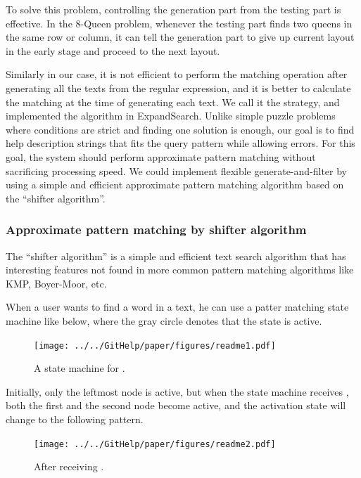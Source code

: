 \documentclass[manuscript,screen,review]{acmart}
\def\ES{\textsf{ExpandSearch}}
\begin{document}
To solve this problem,
controlling the generation part from the testing part is effective.
In the 8-Queen problem,
whenever the testing part finds two queens in the same row or column,
it can tell the generation part to
give up current layout in the early stage and proceed to the next layout.

Similarly in our case,
it is not efficient to perform the matching operation
after generating all the texts from the regular expression,
and it is better to calculate the matching
at the time of generating each text.
We call it the  strategy,
and implemented the algorithm in {\ES}.
Unlike simple puzzle problems where
conditions are strict and finding one solution is enough,
our goal is to find help description strings
that fits the query pattern while allowing errors.
For this goal,
the system should perform approximate pattern matching
without sacrificing processing speed.
%
We could implement flexible generate-and-filter by using a simple and efficient
approximate pattern matching algorithm based on the ``shifter algorithm''.

\subsubsection{Approximate pattern matching by shifter algorithm}

The ``shifter algorithm''\cite{Wu:1992:FTS:135239.135244}
is a simple and efficient
text search algorithm that has interesting features
not found in more common pattern matching algorithms like
KMP\cite{KMP}, Boyer-Moor\cite{Boyer:1977:FSS:359842.359859}, etc.

When a user wants to find a word  in a text,
he can use a patter matching state machine like below,
where the gray circle denotes that the state is active.

\begin{figure}[h]
  \centerline{\texttt{[image: ../../GitHelp/paper/figures/readme1.pdf]}}
  \caption{A state machine for .}
  \label{readme1}
\end{figure}

Initially, only the leftmost node is active, but when the
state machine receives , both the first and the second node become active,
and the activation state will change to the following pattern.

\begin{figure}[h]
  \centerline{\texttt{[image: ../../GitHelp/paper/figures/readme2.pdf]}}
  \caption{After receiving .}
  \label{readme2}
\end{figure}
\end{document}
